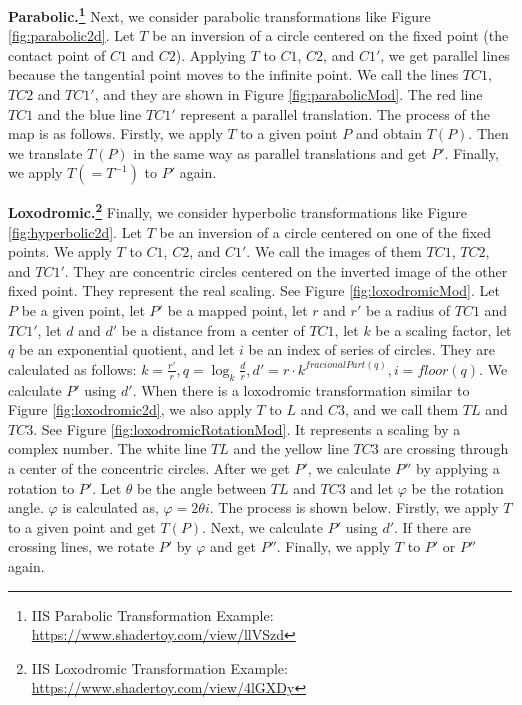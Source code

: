 \noindent\textbf{Parabolic.\footnote{IIS Parabolic Transformation Example: \url{https://www.shadertoy.com/view/llVSzd}}}
 Next, we consider parabolic transformations like Figure \ref{fig:parabolic2d}.
 Let $T$ be an inversion of a circle centered on the fixed point (the contact point of $C1$ and $C2$).
 Applying $T$ to $C1$, $C2$, and $C1'$, we get parallel lines because
 the tangential point moves to the infinite point.
 We call the lines $TC1$, $TC2$ and $ TC1'$, and they are shown in
 Figure \ref{fig:parabolicMod}.
 The red line $TC1$ and the blue line $TC1'$ represent a parallel translation.
 The process of the map is as follows.
 Firstly, we apply $T$ to a given point $P$ and obtain $T(P)$.
 Then we translate $T(P)$ in the same way as parallel translations and get $P'$.
 Finally, we apply $T(= T^{-1}) $ to $P'$ again.

 \noindent\textbf{Loxodromic.\footnote{IIS Loxodromic Transformation Example: \url{https://www.shadertoy.com/view/4lGXDy}}}
 Finally, we consider hyperbolic
 transformations like Figure \ref{fig:hyperbolic2d}.
 Let $T$ be an inversion of a circle centered on one of the fixed
 points.
 We apply $T$ to $C1$, $C2$, and $C1'$.
 We call the images of them $TC1$, $TC2$, and $TC1'$.
 They are concentric circles centered on the inverted image
 of the other fixed point.
 They represent the real scaling.
 See Figure \ref{fig:loxodromicMod}.
 Let $P$ be a given point,
 let $P'$ be a mapped point,
 let $r$ and $r'$ be a radius of $TC1$ and $TC1'$,
 let $d$ and $d'$ be a distance from a center of $TC1$,
 let $k$ be a scaling factor,
 let $q$ be an exponential quotient, and let $i$ be an index of
 series of circles. They are calculated as follows:
 \begin{math}
  k = \frac{r'}{r},
  q = \log_{k} \frac{d}{r},
  d' = r \cdot k^{fracionalPart(q)},
  i = floor(q).
 \end{math}
 We calculate $P'$ using $d'$.
 When there is a loxodromic transformation similar to Figure \ref{fig:loxodromic2d},
 we also apply $T$ to $L$ and $C3$, and we call them $TL$ and $TC3$.
 See Figure \ref{fig:loxodromicRotationMod}.
 It represents a scaling by a complex number.
 The white line $TL$ and the yellow line $TC3$ are crossing
 through a center of the concentric circles.
 After we get $P'$, we calculate $P''$ by applying a rotation to $P'$.
 Let $\theta$ be the angle between $TL$ and $TC3$ and
 let $\varphi$ be the rotation angle.
 $\varphi$ is calculated as, $\varphi = 2 \theta i$.
 The process is shown below.
 Firstly, we apply $T$ to a given point and get $T(P)$.
 Next, we calculate $P'$ using $d'$.
 If there are crossing lines, we rotate $P'$ by $\varphi$ and get $P''$.
 Finally, we apply $T$ to $P'$ or $P''$ again.


